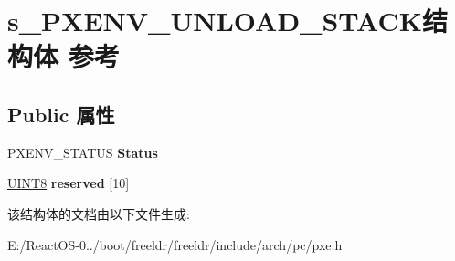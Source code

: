 \hypertarget{structs___p_x_e_n_v___u_n_l_o_a_d___s_t_a_c_k}{}\section{s\+\_\+\+P\+X\+E\+N\+V\+\_\+\+U\+N\+L\+O\+A\+D\+\_\+\+S\+T\+A\+C\+K结构体 参考}
\label{structs___p_x_e_n_v___u_n_l_o_a_d___s_t_a_c_k}
\subsection*{Public 属性}
\begin{DoxyCompactItemize}
\item 
\mbox{\label{structs___p_x_e_n_v___u_n_l_o_a_d___s_t_a_c_k_a166954252bc6659cab1785299457b45d}} 
P\+X\+E\+N\+V\+\_\+\+S\+T\+A\+T\+US {\bfseries Status}
\item 
\mbox{\label{structs___p_x_e_n_v___u_n_l_o_a_d___s_t_a_c_k_a6ab84137c70a7835aba0876e512f9c4f}} 
\hyperlink{_processor_bind_8h_ab27e9918b538ce9d8ca692479b375b6a}{U\+I\+N\+T8} {\bfseries reserved} \mbox{[}10\mbox{]}
\end{DoxyCompactItemize}


该结构体的文档由以下文件生成\+:\begin{DoxyCompactItemize}
\item 
E\+:/\+React\+O\+S-\/0../boot/freeldr/freeldr/include/arch/pc/pxe.\+h\end{DoxyCompactItemize}
